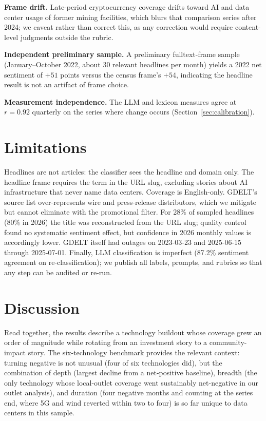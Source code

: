 \documentclass[11pt]{article}
\begin{document}
\textbf{Frame drift.} Late-period cryptocurrency coverage drifts toward AI
and data center usage of former mining facilities, which blurs that
comparison series after 2024; we caveat rather than correct this, as any
correction would require content-level judgments outside the rubric.

\textbf{Independent preliminary sample.} A preliminary fulltext-frame
sample (January--October 2022, about 30 relevant headlines per month)
yields a 2022 net sentiment of $+51$ points versus the census frame's
$+54$, indicating the headline result is not an artifact of frame choice.

\textbf{Measurement independence.} The LLM and lexicon measures agree at
$r=0.92$ quarterly on the series where change occurs
(Section~\ref{sec:calibration}).

\section{Limitations}
\label{sec:limitations}

Headlines are not articles: the classifier sees the headline and domain
only. The headline frame requires the term in the URL slug, excluding
stories about AI infrastructure that never name data centers. Coverage is
English-only. GDELT's source list over-represents wire and press-release
distributors, which we mitigate but cannot eliminate with the promotional
filter. For 28\% of sampled headlines (80\% in 2026) the title was
reconstructed from the URL slug; quality control found no systematic
sentiment effect, but confidence in 2026 monthly values is accordingly
lower. GDELT itself had outages on 2023-03-23 and 2025-06-15 through
2025-07-01. Finally, LLM classification is imperfect (87.2\% sentiment
agreement on re-classification); we publish all labels, prompts, and
rubrics so that any step can be audited or re-run.

\section{Discussion}

Read together, the results describe a technology buildout whose coverage
grew an order of magnitude while rotating from an investment story to a
community-impact story. The six-technology benchmark provides the relevant
context: turning negative is not unusual (four of six technologies did),
but the combination of depth (largest decline from a net-positive
baseline), breadth (the only technology whose local-outlet coverage went
sustainably net-negative in our outlet analysis), and duration (four
negative months and counting at the series end, where 5G and wind reverted
within two to four) is so far unique to data centers in this sample.
\end{document}
